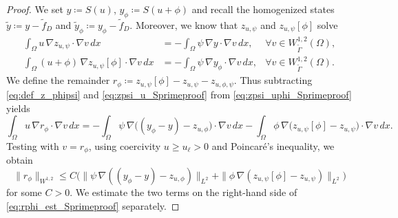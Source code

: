 \documentclass[11pt]{article}
\theoremstyle{definition}
\theoremstyle{remark}
\begin{document}
\begin{proof}
We set $y \coloneqq S(u)$, $y_\phi \coloneqq S(u+\phi)$ and recall the homogenized states
$\tilde y \coloneqq y-\tilde f_D$ and $\tilde y_\phi \coloneqq y_\phi -\tilde f_D$.
Moreover, we know that $z_{u, \psi}$ and $z_{u, \psi}[\phi]$ solve
%
\begin{align}
\int_\Omega u\,\nabla z_{u, \psi}\cdot \nabla v\,dx
&=
-\int_\Omega \psi\,\nabla y\cdot \nabla v\,dx,
& \forall v\in W^{1,2}_{\tilde\Gamma}(\Omega), \label{eq:zpsi_u_Sprimeproof}\\
\int_\Omega (u+\phi)\,\nabla z_{u, \psi}[\phi]\cdot \nabla v\,dx
&=
-\int_\Omega \psi\,\nabla y_\phi\cdot \nabla v\,dx,
&\forall v\in W^{1,2}_{\tilde\Gamma}(\Omega). \label{eq:zpsi_uphi_Sprimeproof}
\end{align}
%
We define the remainder
$
r_\phi \coloneqq z_{u, \psi}[\phi]-z_{u, \psi}-z_{u,\phi,\psi}.
$
Thus subtracting \eqref{eq:def_z_phipsi} and \eqref{eq:zpsi_u_Sprimeproof} from \eqref{eq:zpsi_uphi_Sprimeproof} yields
%
\begin{equation}\label{eq:rphi_identity_Sprimeproof}
\int_\Omega u\,\nabla r_\phi\cdot\nabla v\,dx
=
-\int_\Omega \psi\,\nabla\big((y_\phi-y)-z_{u, \phi}\big)\cdot\nabla v\,dx
-\int_\Omega \phi\,\nabla\big(z_{u, \psi}[\phi]-z_{u, \psi}\big)\cdot\nabla v\,dx .
\end{equation}
%
Testing with $v=r_\phi$, using coercivity $u\ge u_\ell>0$ and Poincar\'e's inequality, we obtain
%
\begin{equation}\label{eq:rphi_est_Sprimeproof}
\|r_\phi\|_{W^{1,2}}
\le
C\Big(
\|\psi\,\nabla((y_\phi-y)-z_{u, \phi})\|_{L^2}
+
\|\phi\,\nabla(z_{u, \psi}[\phi]-z_{u, \psi})\|_{L^2}
\Big)
\end{equation}
%
for some $C > 0$. We estimate the two terms on the right-hand side of \eqref{eq:rphi_est_Sprimeproof} separately.


\end{proof}
\end{document}
